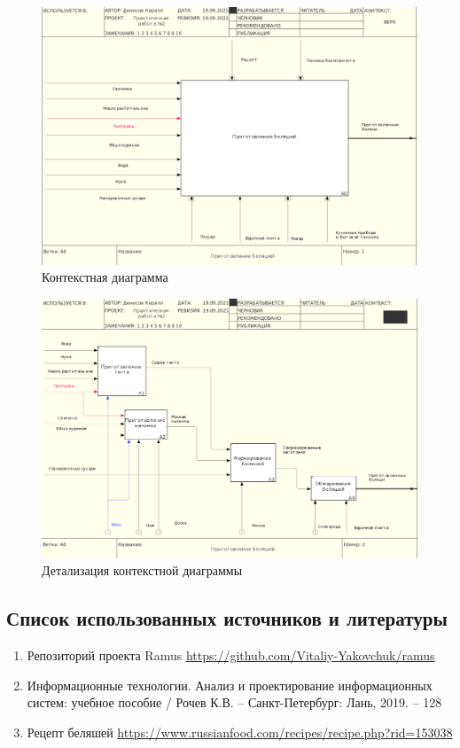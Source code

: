 \documentclass[a4paper,14pt]{extarticle}
\begin{document}
	
\begin{figure}[htpb]
	\centering
	\includegraphics[width=0.7\linewidth]{images/ramusPr2.1}
	\caption{Контекстная диаграмма}
	\label{fig:ramusPr2.1}
\end{figure}
\begin{figure}[htpb]
	\centering
	\includegraphics[width=0.7\linewidth]{images/ramusPr2.2}
	\caption{Детализация контекстной диаграммы}
	\label{fig:ramusPr2.2}
\end{figure}

	\newpage
	\subsection*{Список использованных источников и литературы}
	\begin{enumerate}
		\item Репозиторий проекта Ramus \url{https://github.com/Vitaliy-Yakovchuk/ramus}
		\item Информационные технологии. Анализ и проектирование информационных систем: учебное пособие / Рочев К.В. – Санкт-Петербург: Лань, 2019. – 128
		\item Рецепт беляшей \url{https://www.russianfood.com/recipes/recipe.php?rid=153038}
	\end{enumerate}
\end{document}
